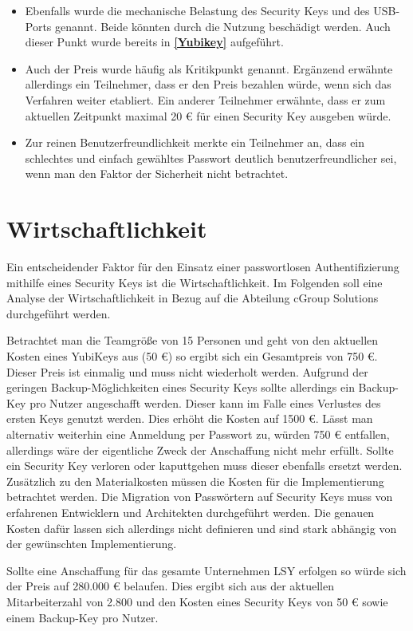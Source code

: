 \begin{itemize}
    \item Ebenfalls wurde die mechanische Belastung des Security Keys und des USB-Ports genannt. Beide könnten durch die Nutzung beschädigt werden. Auch dieser Punkt wurde bereits in \textbf{\ref{Yubikey}} aufgeführt.
    \item Auch der Preis wurde häufig als Kritikpunkt genannt. Ergänzend erwähnte allerdings ein Teilnehmer, dass er den Preis bezahlen würde, wenn sich das Verfahren weiter etabliert. Ein anderer Teilnehmer erwähnte, dass er zum aktuellen Zeitpunkt maximal 20 € für einen Security Key ausgeben würde.
    \item Zur reinen Benutzerfreundlichkeit merkte ein Teilnehmer an, dass ein schlechtes und einfach gewähltes Passwort deutlich benutzerfreundlicher sei, wenn man den Faktor der Sicherheit nicht betrachtet.
\end{itemize}


\section{Wirtschaftlichkeit}
Ein entscheidender Faktor für den Einsatz einer passwortlosen Authentifizierung mithilfe eines Security Keys ist die Wirtschaftlichkeit. Im Folgenden soll eine Analyse der Wirtschaftlichkeit in Bezug auf die Abteilung cGroup Solutions durchgeführt werden.

Betrachtet man die Teamgröße von 15 Personen und geht von den aktuellen Kosten eines YubiKeys aus (50 €) so ergibt sich ein Gesamtpreis von 750 €. Dieser Preis ist einmalig und muss nicht wiederholt werden. Aufgrund der geringen Backup-Möglichkeiten eines Security Keys sollte allerdings ein Backup-Key pro Nutzer angeschafft werden. Dieser kann im Falle eines Verlustes des ersten Keys genutzt werden. Dies erhöht die Kosten auf 1500 €.
Lässt man alternativ weiterhin eine Anmeldung per Passwort zu, würden 750 € entfallen, allerdings wäre der eigentliche Zweck der Anschaffung nicht mehr erfüllt.
Sollte ein Security Key verloren oder kaputtgehen muss dieser ebenfalls ersetzt werden.
Zusätzlich zu den Materialkosten müssen die Kosten für die Implementierung betrachtet werden. Die Migration von Passwörtern auf Security Keys muss von erfahrenen Entwicklern und Architekten durchgeführt werden. Die genauen Kosten dafür lassen sich allerdings nicht definieren und sind stark abhängig von der gewünschten Implementierung. 

Sollte eine Anschaffung für das gesamte Unternehmen \ac{LSY} erfolgen so würde sich der Preis auf 280.000 € belaufen. Dies ergibt sich aus der aktuellen Mitarbeiterzahl von 2.800 und den Kosten eines Security Keys von 50 € sowie einem Backup-Key pro Nutzer.

